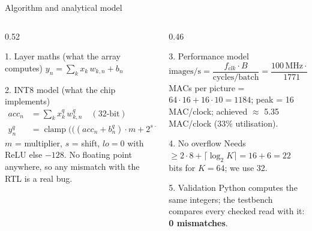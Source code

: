 \documentclass[aspectratio=169,10pt,t]{beamer}
\newcommand{\py}[1]{\texttt{\detokenize{#1}}}
\begin{document}
\begin{frame}{Algorithm and analytical model}
  \begin{columns}[T]
    \begin{column}{0.52\textwidth}
      \begin{block}{1. Layer maths (what the array computes)}
        \small $y_n=\displaystyle\sum_{k} x_k\,w_{k,n}+b_n$
      \end{block}
      \begin{block}{2. INT8 model (what the chip implements)}
        \small
        \begin{align*}
          acc_n &= \textstyle\sum_k x^{q}_k\,w^{q}_{k,n} \quad(\text{32-bit})\\
          y^{q}_n &= \operatorname{clamp}\!\Big(\big((acc_n+b^{q}_n)\cdot m + 2^{s-1}\big)\gg s,\ lo,\ 127\Big)
        \end{align*}
        \footnotesize $m$ = multiplier, $s$ = shift, $lo=0$ with ReLU else $-128$. No floating point anywhere, so any mismatch with the RTL is a real bug.
      \end{block}
    \end{column}
    \begin{column}{0.46\textwidth}
      \begin{block}{3. Performance model}
        \small $\text{images/s}=\dfrac{f_{clk}\cdot B}{\text{cycles/batch}}=\dfrac{100\,\text{MHz}\cdot 8}{1771}\approx 4.5\times10^{5}$\\[3pt]
        \footnotesize MACs per picture = $64{\cdot}16+16{\cdot}10 = 1184$; peak = 16 MAC/clock; achieved $\approx$ 5.35 MAC/clock (33\% utilisation).
      \end{block}
      \begin{block}{4. No overflow}
        \footnotesize Needs $\ge 2\!\cdot\!8+\lceil\log_2 K\rceil = 16+6 = 22$ bits for $K{=}64$; we use 32.
      \end{block}
      \begin{block}{5. Validation}
        \footnotesize Python \py{golden.py} computes the same integers; the testbench compares every checked read with it: \textbf{0 mismatches}.
      \end{block}
    \end{column}
  \end{columns}
\end{frame}
\end{document}
